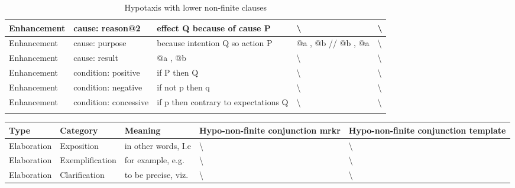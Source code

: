 \begin{landscape}
\begin{longtable}{|l|l|p{3cm}|p{5cm}|p{5cm}|}
			Enhancement & cause: reason@2        & effect Q because of cause P          & \textbackslash                                                          & \textbackslash                                 \\ \hline
			Enhancement & cause: purpose         & because intention Q so action P      & @a , @b // @b , @a                                                      & \textbackslash                                 \\ \hline
			Enhancement & cause: result          & @a , @b                              & \textbackslash                                                          & \textbackslash                                 \\ \hline
			Enhancement & condition: positive    & if P then Q                          & \textbackslash                                                          & \textbackslash                                 \\ \hline
			Enhancement & condition: negative    & if not p then q                      & \textbackslash                                                          & \textbackslash                                 \\ \hline
			Enhancement & condition: concessive  & if p then contrary to expectations Q & \textbackslash                                                          & \textbackslash                                 \\ \hline
			\caption{Hypotaxis with lower non-finite clauses}
			\label{tab:hypotaxis-non-finite}
		\end{longtable}
		\begin{longtable}{|l|l|p{3cm}|p{5cm}|p{5cm}|}
			\hline
			{\bf Type}  & {\bf Category}         & {\bf Meaning}                        & {\bf Hypo-non-finite conjunction mrkr} & {\bf Hypo-non-finite conjunction template} \\ \hline
			Elaboration & Exposition             & in other words, I.e                  & \textbackslash                         & \textbackslash                             \\ \hline
			Elaboration & Exemplification        & for example, e.g.                    & \textbackslash                         & \textbackslash                             \\ \hline
			Elaboration & Clarification          & to be precise, viz.                  & \textbackslash                         & \textbackslash                             \\ \hline

\end{longtable}
\end{landscape}
